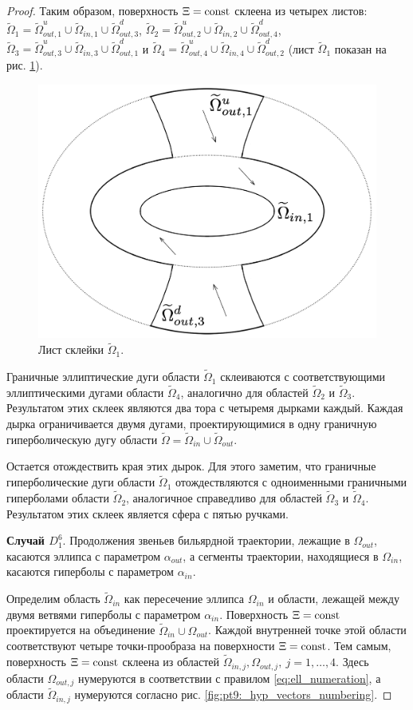 \begin{proof}
Таким образом, поверхность $\Xi = \mathrm{const}$ склеена из четырех листов:
$\widetilde{\Omega}_1 = \widetilde{\Omega}_{out, 1}^u \cup \widetilde{\Omega}_{in, 1} \cup \widetilde{\Omega}_{out, 3}^d$, 
$\widetilde{\Omega}_2 = \widetilde{\Omega}_{out, 2}^u \cup \widetilde{\Omega}_{in, 2} \cup \widetilde{\Omega}_{out, 4}^d$, 
$\widetilde{\Omega}_3 = \widetilde{\Omega}_{out, 3}^u \cup \widetilde{\Omega}_{in, 3} \cup \widetilde{\Omega}_{out, 1}^d$ и 
 $\widetilde{\Omega}_4 = \widetilde{\Omega}_{out, 4}^u \cup \widetilde{\Omega}_{in, 4} \cup \widetilde{\Omega}_{out, 2}^d$ (лист $\widetilde{\Omega}_1$ показан на рис. \ref{fig:pt9:_hyp_page}).
 \begin{figure}[!htb]
 \centering
\includegraphics[width=0.4\linewidth]{images/ch4/section2/problems_vectors_2.pdf}
    \caption{Лист склейки $\widetilde{\Omega}_1$.}
    \label{fig:pt9:_hyp_page}
\end{figure}

 
Граничные эллиптические дуги области $\widetilde{\Omega}_1$  склеиваются с соответствующими эллиптическими дугами  области $\widetilde{\Omega}_4$, аналогично для областей $\widetilde{\Omega}_2$ и $\widetilde{\Omega}_3$. Результатом этих склеек являются два тора с четыремя дырками каждый. 
Каждая дырка ограничивается двумя дугами, проектирующимися в одну граничную гиперболическую дугу области $\widetilde{\Omega} = \widetilde{\Omega}_{in} \cup \widetilde{\Omega}_{out}$.

Остается отождествить края этих дырок. Для этого заметим, что граничные гиперболические дуги области $\widetilde{\Omega}_1$ отождествляются с одноименными граничными гиперболами области $\widetilde{\Omega}_2$, аналогичное справедливо для областей $\widetilde{\Omega}_3$ и $\widetilde{\Omega}_4$. Результатом этих склеек является сфера с пятью ручками. 

\textbf{Случай $D_1^6$}.
Продолжения звеньев бильярдной траектории, лежащие в $\Omega_{out}$, касаются эллипса с параметром $\alpha_{out}$, а сегменты траектории, находящиеся в $\Omega_{in}$, касаются гиперболы с параметром $\alpha_{in}$. 

Определим область $\widetilde{\Omega}_{in}$ как пересечение эллипса $\Omega_{in}$ и области, лежащей между двумя ветвями гиперболы с параметром $\alpha_{in}$.
Поверхность  $\Xi = \mathrm{const}$ проектируется на объединение $\widetilde{\Omega}_{in} \cup \Omega_{out}$. 
Каждой внутренней точке этой области соответствуют четыре точки-прообраза на поверхности $\Xi = \mathrm{const}$.
Тем самым, поверхность $\Xi = \mathrm{const}$ склеена из областей $\widetilde{\Omega}_{in, j}, \Omega_{out, j}, \ j=1,\ldots,4$.
Здесь области $\Omega_{out, j}$ нумеруются в соответствии с правилом \eqref{eq:ell_numeration}, а области $\widetilde{\Omega}_{in, j}$ нумеруются согласно рис. \ref{fig:pt9:_hyp_vectors_numbering}.



\end{proof}
